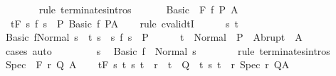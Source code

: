 \begin{isabellebody}
\ \ \ \ \ \ \isamarkupfalse%
\ {\isacharparenleft}rule\ terminates{\isachardot}intros{\isacharparenright}\isanewline
\ \ \isamarkupfalse%
\isanewline
{}\isamarkupfalse%
\isanewline
\ \ \isamarkupfalse%
\ {\isacharparenleft}Basic\ {\isasymTheta}\ F\ f\ P\ A{\isacharparenright}\isanewline
\ \ \isamarkupfalse%
\ {\isachardoublequoteopen}{\isasymGamma}{\isacharcomma}{\isasymTheta}\ {\isasymTurnstile}\isactrlsub t\isactrlbsub {\isacharslash}F\isactrlesub \ {\isacharbraceleft}s{\isachardot}\ f\ s\ {\isasymin}\ P{\isacharbraceright}\ {\isacharparenleft}Basic\ f{\isacharparenright}\ P{\isacharcomma}A{\isachardoublequoteclose}\isanewline
\ \ \isamarkupfalse%
\ {\isacharparenleft}rule\ cvalidtI{\isacharparenright}\isanewline
\ \ \ \ \isamarkupfalse%
\ s\ t\isanewline
\ \ \ \ \isamarkupfalse%
\ {\isachardoublequoteopen}{\isasymGamma}{\isasymturnstile}{\isasymlangle}Basic\ f{\isacharcomma}Normal\ s{\isasymrangle}\ {\isasymRightarrow}\ t{\isachardoublequoteclose}\ {\isachardoublequoteopen}s\ {\isasymin}\ {\isacharbraceleft}s{\isachardot}\ f\ s\ {\isasymin}\ P{\isacharbraceright}{\isachardoublequoteclose}\isanewline
\ \ \ \ \isamarkupfalse%
\ {\isachardoublequoteopen}t\ {\isasymin}\ Normal\ {\isacharbackquote}\ P\ {\isasymunion}\ Abrupt\ {\isacharbackquote}\ A{\isachardoublequoteclose}\isanewline
\ \ \ \ \ \ \isamarkupfalse%
\ cases\ auto\isanewline
\ \ \isamarkupfalse%
\isanewline
\ \ \ \ \isamarkupfalse%
\ s\ \isamarkupfalse%
\ {\isachardoublequoteopen}{\isasymGamma}{\isasymturnstile}Basic\ f\ {\isasymdown}\ Normal\ s{\isachardoublequoteclose}\isanewline
\ \ \ \ \ \ \isamarkupfalse%
\ {\isacharparenleft}rule\ terminates{\isachardot}intros{\isacharparenright}\isanewline
\ \ \isamarkupfalse%
\isanewline
{}\isamarkupfalse%
\isanewline
\ \ \isamarkupfalse%
\ {\isacharparenleft}Spec\ {\isasymTheta}\ F\ r\ Q\ A{\isacharparenright}\isanewline
\ \ \isamarkupfalse%
\ {\isachardoublequoteopen}{\isasymGamma}{\isacharcomma}{\isasymTheta}{\isasymTurnstile}\isactrlsub t\isactrlbsub {\isacharslash}F\isactrlesub \ {\isacharbraceleft}s{\isachardot}\ {\isacharparenleft}{\isasymforall}t{\isachardot}\ {\isacharparenleft}s{\isacharcomma}\ t{\isacharparenright}\ {\isasymin}\ r\ {\isasymlongrightarrow}\ t\ {\isasymin}\ Q{\isacharparenright}\ {\isasymand}\ {\isacharparenleft}{\isasymexists}t{\isachardot}\ {\isacharparenleft}s{\isacharcomma}\ t{\isacharparenright}\ {\isasymin}\ r{\isacharparenright}{\isacharbraceright}\ Spec\ r\ Q{\isacharcomma}A{\isachardoublequoteclose}\isanewline

\end{isabellebody}
